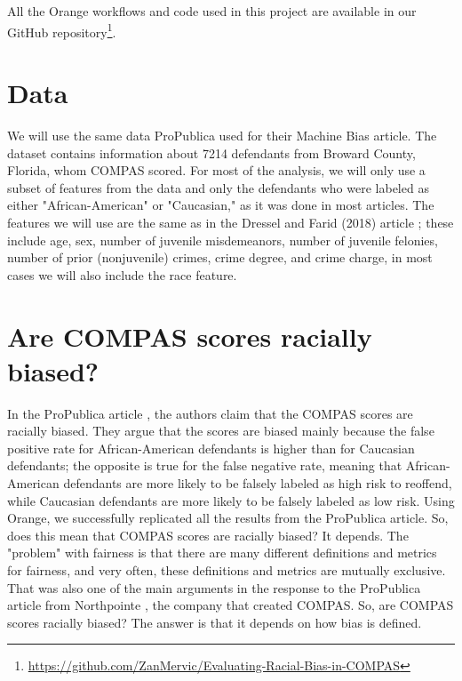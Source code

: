 \documentclass[sigconf,nonacm]{acmart}
\begin{document}
All the Orange workflows and code used in this project are available in our GitHub repository\footnote{\url{https://github.com/ZanMervic/Evaluating-Racial-Bias-in-COMPAS}}.

\section{Data}
We will use the same data ProPublica used for their Machine Bias \cite{angwin2022machine} article. The dataset contains information about 7214 defendants from Broward County, Florida, whom COMPAS scored. For most of the analysis, we will only use a subset of features from the data and only the defendants who were labeled as either "African-American" or "Caucasian," as it was done in most articles. The features we will use are the same as in the Dressel and Farid (2018) article \cite{dressel2018accuracy}; these include age, sex, number of juvenile misdemeanors, number of juvenile felonies, number of prior (nonjuvenile) crimes, crime degree, and crime charge, in most cases we will also include the race feature.

\section{Are COMPAS scores racially biased?}
In the ProPublica article \cite{angwin2022machine}, the authors claim that the COMPAS scores are racially biased. They argue that the scores are biased mainly because the false positive rate for African-American defendants is higher than for Caucasian defendants; the opposite is true for the false negative rate, meaning that African-American defendants are more likely to be falsely labeled as high risk to reoffend, while Caucasian defendants are more likely to be falsely labeled as low risk. Using Orange, we successfully replicated all the results from the ProPublica article. So, does this mean that COMPAS scores are racially biased? It depends. The "problem" with fairness is that there are many different definitions and metrics for fairness, and very often, these definitions and metrics are mutually exclusive. That was also one of the main arguments in the response to the ProPublica article from Northpointe \cite{dieterich2016compas}, the company that created COMPAS. So, are COMPAS scores racially biased? The answer is that it depends on how bias is defined.
\end{document}
